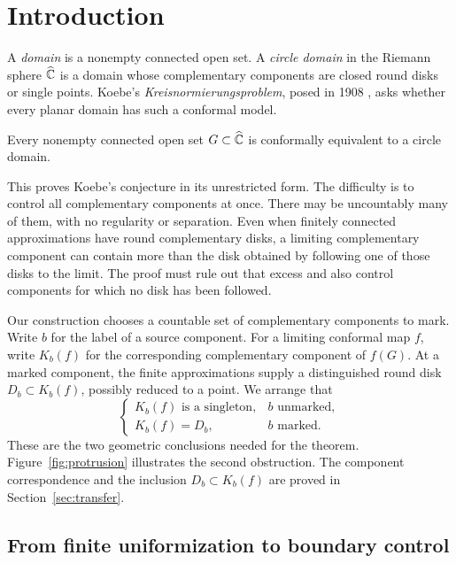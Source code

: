 \section{Introduction}\label{sec:introduction}

A \emph{domain} is a nonempty connected open set. A \emph{circle domain}
in the Riemann sphere $\widehat{\mathbb C}$ is a domain whose complementary components
are closed round disks or single points. Koebe's
\emph{Kreisnormierungsproblem}, posed in 1908 \cite{Koebe1908}, asks
whether every planar domain has such a conformal model.

\begin{theorem}\label{thm:main}
Every nonempty connected open set $G\subset\widehat{\mathbb C}$ is conformally equivalent
to a circle domain.
\end{theorem}

This proves Koebe's conjecture in its unrestricted form.  The difficulty
is to control all complementary components at once.
There may be uncountably many of them, with no regularity or separation.
Even when finitely connected approximations have round complementary
disks, a limiting complementary component can contain more than the
disk obtained by following one of those disks to the limit. The proof
must rule out that excess and also control components for which no disk
has been followed.

Our construction chooses a countable set of complementary components
to mark. Write $b$ for the label of a source component. For a limiting
conformal map $f$, write $K_b(f)$ for the corresponding complementary
component of $f(G)$. At a marked
component, the finite approximations supply a distinguished round disk
$D_b\subset K_b(f)$, possibly reduced to a point. We arrange that
\[
 \begin{cases}
 K_b(f)\text{ is a singleton},& b\text{ unmarked},\\
 K_b(f)=D_b,& b\text{ marked}.
 \end{cases}
\]
These are the two geometric conclusions needed for the theorem.
Figure~\ref{fig:protrusion} illustrates the second obstruction. The
component correspondence and the inclusion $D_b\subset K_b(f)$ are
proved in Section~\ref{sec:transfer}.



\subsection{From finite uniformization to boundary control}

